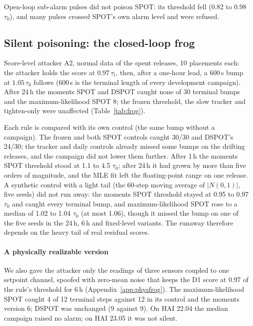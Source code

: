 \documentclass[sigconf,review,anonymous]{acmart}
\begin{document}
Open-loop sub-alarm pulses did not poison SPOT: its threshold fell (0.82 to 0.98 $\tau_0$), and many
pulses crossed SPOT's own alarm level and were refused.


\subsection{Silent poisoning: the closed-loop frog}
\label{sec:frog}

Score-level attacker A2, normal data of the spent releases, 10 placements each: the attacker holds
the score at $0.97\,\tau_t$, then, after a one-hour lead, a 600\,s bump at $1.05\,\tau_0$ follows
(600\,s is the terminal length of every development campaign). After 24\,h the moments SPOT and
DSPOT caught none of 30 terminal bumps and the maximum-likelihood SPOT 8; the frozen threshold, the slow
tracker and tighten-only were unaffected (Table~\ref{tab:frog}).


Each rule is compared with its own control (the same bump without a campaign). The frozen and both
SPOT controls caught 30/30 and DSPOT's 24/30; the tracker and daily controls already missed some
bumps on the drifting releases, and the campaign did not lower them further. After 1\,h the moments
SPOT threshold stood at 1.1 to 4.5 $\tau_0$; after 24\,h it had grown by more than five orders of
magnitude, and the MLE fit left the floating-point range on one release. A synthetic control with a
light tail (the 60-step moving average of $|N(0, 1)|$, five seeds) did not run away: the moments SPOT
threshold stayed at 0.95 to 0.97 $\tau_0$ and caught every terminal bump, and maximum-likelihood SPOT
rose to a median of 1.02 to 1.04 $\tau_0$ (at most 1.06), though it missed the bump on one of the five seeds in the 24\,h,
6\,h and fixed-level variants. The runaway therefore depends on the heavy tail of real residual
scores.

\paragraph{A physically realizable version}
We also gave the attacker only the readings of three sensors coupled to one setpoint channel, spoofed
with zero-mean noise that keeps the D1 score at 0.97 of the rule's threshold for 6\,h
(Appendix~\ref{app:physfrog}). The maximum-likelihood SPOT caught 4 of 12 terminal steps against 12 in
its control and the moments version 6; DSPOT was unchanged (9 against 9). On HAI 22.04 the median
campaign raised no alarm; on HAI 23.05 it was not silent.
\end{document}
